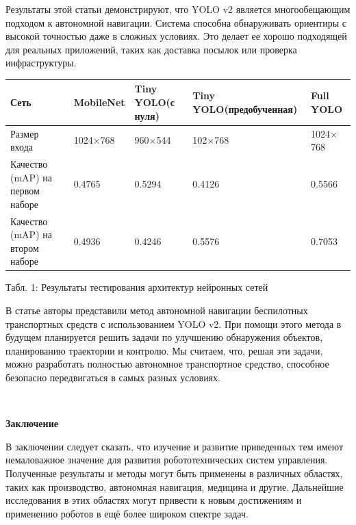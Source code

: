 \documentclass[russian,11pt]{article}
\providecommand{\header}[1]{
\,
\begin{center}
{\Large \textbf{#1}}
\end{center}
}
\begin{document}
Результаты этой статьи демонстрируют, что YOLO v2 является многообещающим подходом к автономной навигации. Система способна обнаруживать ориентиры с высокой точностью даже в сложных условиях. Это делает ее хорошо подходящей для реальных приложений, таких как доставка посылок или проверка инфраструктуры.

\begin{table}[h!]
\centering
\begin{tabular}{|m{3cm}||m{1.8cm}|m{2cm}|m{2.9cm}|m{1.9cm}|} 
\hline
\begin{center}Сеть\end{center} & MobileNet & Tiny YOLO\newline (с нуля) & Tiny YOLO\newline (предобученная) & Full YOLO \\ 
\hline
\hline
Размер входа & 1024$\times$768 & 960$\times$544 & 102$\times$768 & 1024$\times$768 \\ 
\hline
Качество (mAP) на первом наборе & 0.4765 & 0.5294 & 0.4126 & 0.5566 \\ 
\hline
Качество (mAP) на втором наборе & 0.4936 & 0.4246 & 0.5576 & 0.7053 \\ 
\hline
\end{tabular}
\begin{center}{\footnotesize Табл. 1: Результаты тестирования архитектур нейронных сетей}\end{center}
\end{table}

В статье авторы представили метод автономной навигации беспилотных транспортных средств с использованием YOLO v2. При помощи этого метода в будущем планируется решить задачи по улучшению обнаружения объектов, планированию траектории и контролю. Мы считаем, что, решая эти задачи, можно разработать полностью автономное транспортное средство, способное безопасно передвигаться в самых разных условиях.

\header{Заключение}

В заключении следует сказать, что изучение и развитие приведенных тем имеют немаловажное значение для развития робототехнических систем управления. Полученные результаты и методы могут быть применены в различных областях, таких как производство, автономная навигация, медицина и другие. Дальнейшие исследования в этих областях могут привести к новым достижениям и применению роботов в ещё более широком спектре задач.

\printbibliography[title={\centering Список литературы}]
\end{document}
